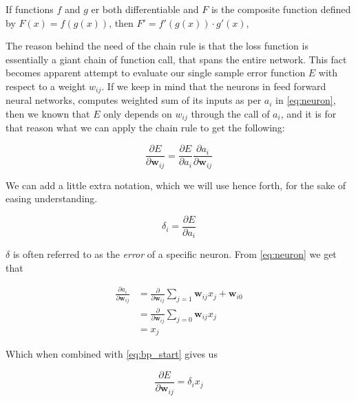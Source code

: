 \begin{lemma}
\label{lemma:chainrule}

    If functions $f$ and $g$ er both differentiable and $F$ is the composite
    function defined by $F(x) = f(g(x))$, then $F' = f'(g(x)) \cdot g'(x)$,

\end{lemma}

The reason behind the need of the chain rule is that the loss function is
essentially a giant chain of function call, that spans the entire network. This
fact becomes apparent attempt to evaluate our single sample error function $E$
with respect to a weight $w_{ij}$. If we keep in mind that the neurons in feed
forward neural networks, computes weighted sum of its inputs as per $a_i$ in
\eqref{eq:neuron}, then we known that $E$ only depends on $w_{ij}$ through the
call of $a_i$, and it is for that reason what we can apply the chain rule to get
the following:

\begin{equation}\label{eq:bp_start}
\frac{\partial E}{\partial \mathbf{w}_{ij}} = \frac{\partial E}{\partial a_i}
\frac{\partial a_i}{\partial \mathbf{w}_{ij}}
\end{equation}

We can add a little extra notation, which we will use hence forth, for the
sake of easing understanding.

\begin{equation}\label{eq:delta}
\delta_i = \frac{\partial E}{\partial a_i}
\end{equation}

$\delta$ is often referred to as the \textit{error} of a specific neuron.
From \eqref{eq:neuron} we get that

\begin{align}
\frac{\partial a_i}{\partial \mathbf{w}_{ij}} &= \frac{\partial}{\partial \mathbf{w}_{ij}}
\sum_{j=1} \mathbf{w}_{ij} x_j + \mathbf{w}_{i0}\\
&= \frac{\partial}{\partial \mathbf{w}_{ij}} \sum_{j = 0} \mathbf{w}_{ij} x_j\\
&= x_j
\end{align}

Which when combined with \ref{eq:bp_start} gives us

\begin{equation}
\label{eq:deriv}
\frac{\partial E}{\partial \mathbf{w}_{ij}} = \delta_i x_j
\end{equation}

